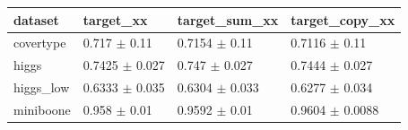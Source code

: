 \begin{tabular}{llll}
\toprule
dataset & target\_xx & target\_sum\_xx & target\_copy\_xx \\
\midrule
covertype & 0.717 $\pm$ 0.11 & 0.7154 $\pm$ 0.11 & 0.7116 $\pm$ 0.11 \\
higgs & 0.7425 $\pm$ 0.027 & 0.747 $\pm$ 0.027 & 0.7444 $\pm$ 0.027 \\
higgs\_low & 0.6333 $\pm$ 0.035 & 0.6304 $\pm$ 0.033 & 0.6277 $\pm$ 0.034 \\
miniboone & 0.958 $\pm$ 0.01 & 0.9592 $\pm$ 0.01 & 0.9604 $\pm$ 0.0088 \\
\bottomrule
\end{tabular}
